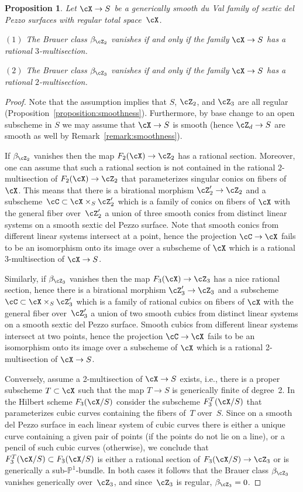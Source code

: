 \documentclass[11pt]{amsart}
\renewcommand{\P}{{\mathbb{P}}}
\theoremstyle{plain}
\newtheorem{proposition}[theorem]{Proposition}
\theoremstyle{definition}
\theoremstyle{remark}
\begin{document}
\begin{proposition}
Let $\cX \to S$ be a generically smooth du Val family of sextic del Pezzo surfaces with regular total space~$\cX$.

\noindent$(1)$ The Brauer class $\beta_{\cZ_2}$ vanishes if and only if the family $\cX \to S$ has a rational $3$-multisection.

\noindent$(2)$ The Brauer class $\beta_{\cZ_3}$ vanishes if and only if the family $\cX \to S$ has a rational $2$-multisection.
\end{proposition}
\begin{proof}
Note that the assumption implies that $S$, $\cZ_2$, and $\cZ_3$ are all regular (Proposition~\ref{proposition:smoothness}).
Furthermore, by base change to an open subscheme in $S$ we may assume that $\cX \to S$ is smooth
(hence $\cZ_d \to S$ are smooth as well by Remark~\ref{remark:smoothness}).

If $\beta_{\cZ_2}$ vanishes then the map $F_2(\cX) \to \cZ_2$ has a rational section.
Moreover, one can assume that such a rational section is not contained in the rational $2$-multisection of $F_2(\cX) \to \cZ_2$
that parameterizes singular conics on fibers of $\cX$.
This means that there is a birational morphism $\cZ'_2 \to \cZ_2$ and a subscheme~$\cC \subset \cX \times_S \cZ'_2$ 
which is a family of conics on fibers of $\cX$ with the general fiber over~$\cZ'_2$ a union of three smooth conics
from distinct linear systems on a smooth sextic del Pezzo surface.
Note that smooth conics from different linear systems intersect at a point, 
hence the projection $\cC \to \cX$ fails to be an isomorphism onto its image over a subscheme of $\cX$ 
which is a rational 3-multisection of $\cX \to S$.

Similarly, if $\beta_{\cZ_3}$ vanishes then the map $F_3(\cX) \to \cZ_3$ has a nice rational section,
hence there is a birational morphism $\cZ'_3 \to \cZ_3$ and a subscheme~$\cC \subset \cX \times_S \cZ'_3$ 
which is a family of rational cubics on fibers of $\cX$ with the general fiber over~$\cZ'_3$ a union of two smooth cubics
from distinct linear systems on a smooth sextic del Pezzo surface.
Smooth cubics from different linear systems intersect at two points, 
hence the projection $\cC \to \cX$ fails to be an isomorphism onto its image over a subscheme of $\cX$ 
which is a rational 2-multisection of $\cX \to S$.

Conversely, assume a 2-multisection of $\cX \to S$ exists, i.e., there is a proper subscheme $T \subset \cX$ 
such that the map $T \to S$ is generically finite of degree~2. In the Hilbert scheme $F_3(\cX/S)$ consider 
the subscheme $F_3^T(\cX/S)$ that parameterizes cubic curves containing the fibers of~$T$ over~$S$.
Since on a smooth del Pezzo surface in each linear system of cubic curves there is either a unique curve 
containing a given pair of points (if the points do not lie on a line), or a pencil of such cubic curves (otherwise),
we conclude that $F_3^T(\cX/S) \subset F_3(\cX/S)$ is 
either a rational section of $F_3(\cX/S) \to \cZ_3$ or is generically a sub-$\P^1$-bundle. 
In both cases it follows that the Brauer class $\beta_{\cZ_3}$ vanishes generically over~$\cZ_3$, 
and since~$\cZ_3$ is regular, $\beta_{\cZ_3} = 0$.


\end{proof}
\end{document}
